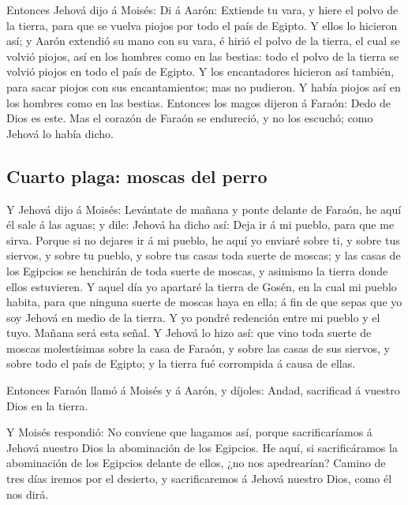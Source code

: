  Entonces Jehová dijo á Moisés: Di á Aarón: Extiende tu
vara, y hiere el polvo de la tierra, para que se vuelva piojos por todo
el país de Egipto.  Y ellos lo hicieron así; y Aarón
extendió su mano con su vara, é hirió el polvo de la tierra, el cual se
volvió piojos, así en los hombres como en las bestias: todo el polvo de
la tierra se volvió piojos en todo el país de Egipto.  Y
los encantadores hicieron así también, para sacar piojos con sus
encantamientos; mas no pudieron. Y había piojos así en los hombres como
en las bestias.  Entonces los magos dijeron á Faraón:
Dedo de Dios es este. Mas el corazón de Faraón se endureció, y no los
escuchó; como Jehová lo había dicho.

\hypertarget{cuarto-plaga-moscas-del-perro}{%
\subsection{Cuarto plaga: moscas del
perro}\label{cuarto-plaga-moscas-del-perro}}

 Y Jehová dijo á Moisés: Levántate de mañana y ponte
delante de Faraón, he aquí él sale á las aguas; y dile: Jehová ha dicho
así: Deja ir á mi pueblo, para que me sirva.  Porque si
no dejares ir á mi pueblo, he aquí yo enviaré sobre ti, y sobre tus
siervos, y sobre tu pueblo, y sobre tus casas toda suerte de moscas; y
las casas de los Egipcios se henchirán de toda suerte de moscas, y
asimismo la tierra donde ellos estuvieren.  Y aquel día
yo apartaré la tierra de Gosén, en la cual mi pueblo habita, para que
ninguna suerte de moscas haya en ella; á fin de que sepas que yo soy
Jehová en medio de la tierra.  Y yo pondré redención
entre mi pueblo y el tuyo. Mañana será esta señal.  Y
Jehová lo hizo así: que vino toda suerte de moscas molestísimas sobre la
casa de Faraón, y sobre las casas de sus siervos, y sobre todo el país
de Egipto; y la tierra fué corrompida á causa de ellas.

 Entonces Faraón llamó á Moisés y á Aarón, y díjoles:
Andad, sacrificad á vuestro Dios en la tierra.

 Y Moisés respondió: No conviene que hagamos así, porque
sacrificaríamos á Jehová nuestro Dios la abominación de los Egipcios. He
aquí, si sacrificáramos la abominación de los Egipcios delante de ellos,
¿no nos apedrearían?  Camino de tres días iremos por el
desierto, y sacrificaremos á Jehová nuestro Dios, como él nos dirá.

